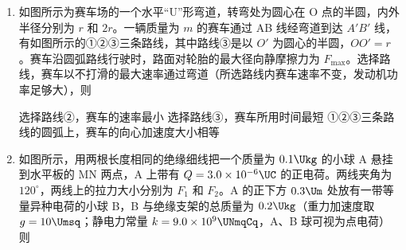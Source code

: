 \documentclass[\gkver]{gaokaozhenti}
\begin{document}
\begin{enumerate}
{弹射器对舰载机所做的功为 $1.1\times10^{8}\UJ$}
{弹射器对舰载机做功的平均功率为 $8.8\times10^{7}\UW$}
{舰载机在弹射过程中的加速度大小为 $32\Umsq$}


\item
如图所示为赛车场的一个水平“U”形弯道，转弯处为圆心在 O 点的半圆，内外半径分别为 $r$ 和 $2r$。一辆质量为 $m$ 的赛车通过 AB 线经弯道到达 $A'B'$ 线，有如图所示的①②③三条路线，其中路线③是以 $O'$ 为圆心的半圆，$OO'=r$。赛车沿圆弧路线行驶时，路面对轮胎的最大径向静摩擦力为 $F_{\max}$。选择路线，赛车以不打滑的最大速率通过弯道（所选路线内赛车速率不变，发动机功率足够大），则


{选择路线②，赛车的速率最小}
{选择路线③，赛车所用时间最短}
{①②③三条路线的圆弧上，赛车的向心加速度大小相等}


\item
如图所示，用两根长度相同的绝缘细线把一个质量为 $0.1\Ukg$ 的小球 A 悬挂到水平板的 MN 两点，A 上带有 $Q=3.0\times10^{-6}\UC$ 的正电荷。两线夹角为 $120^\circ$，两线上的拉力大小分别为 $F_{1}$ 和 $F_{2}$。A 的正下方 $0.3\Um$ 处放有一带等量异种电荷的小球 B，B 与绝缘支架的总质量为 $0.2\Ukg$（重力加速度取 $g=10\Umsq$；静电力常量 $k=9.0\times10^{9}\UNmqCq$，A、B 球可视为点电荷）则


\end{enumerate}
\end{document}
